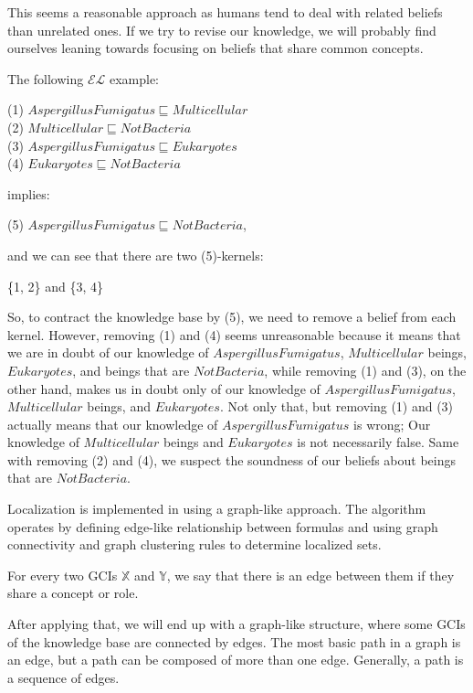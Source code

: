 This seems a reasonable approach as humans tend to deal with related beliefs than unrelated ones. If we try to revise our knowledge, we will probably find ourselves leaning towards focusing on beliefs that share common concepts. 

The following $\mathcal{EL}$ example:
\begin{center}
(1) $AspergillusFumigatus \sqsubseteq Multicellular $ \\
(2) $Multicellular \sqsubseteq NotBacteria$ \\
(3) $AspergillusFumigatus \sqsubseteq Eukaryotes$ \\
(4) $Eukaryotes \sqsubseteq NotBacteria$ 
\end{center}
implies:
\begin{center}
(5) $AspergillusFumigatus \sqsubseteq NotBacteria$,
\end{center}
and we can see that there are two (5)-kernels:
\begin{center}
\{1, 2\} and \{3, 4\}
\end{center}

So, to contract the knowledge base by (5), we need to remove a belief from each kernel. However, removing (1) and (4) seems unreasonable because it means that we are in doubt of our knowledge of $AspergillusFumigatus$, $Multicellular$ beings, $Eukaryotes$, and beings that are $NotBacteria$, while removing (1) and (3), on the other hand, makes us in doubt only of our knowledge of $AspergillusFumigatus$, $Multicellular$ beings, and $Eukaryotes$. Not only that, but removing (1) and (3) actually means that our knowledge of $AspergillusFumigatus$ is wrong; Our knowledge of $Multicellular$ beings and $Eukaryotes$ is not necessarily false. Same with removing (2) and (4), we suspect the soundness of our beliefs about beings that are $NotBacteria$.

Localization is implemented in \cite{zwei} using a graph-like approach. The algorithm operates by defining edge-like relationship between formulas and using graph connectivity and graph clustering rules to determine localized sets. 

\begin{defn}
For every two GCIs $\mathbb{X}$ and $\mathbb{Y}$, we say that there is an edge between them if they share a concept or role.
\end{defn}

After applying that, we will end up with a graph-like structure, where some GCIs of the knowledge base are connected by edges. The most basic path in a graph is an edge, but a path can be composed of more than one edge. Generally, a path is a sequence of edges.

